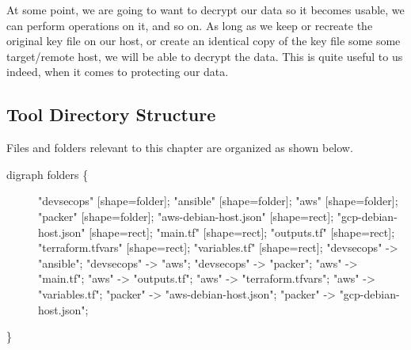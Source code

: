At some point, we are going to want to decrypt our data so it becomes
usable, we can perform operations on it, and so on. As long as we keep
or recreate the original key file on our host, or create an identical
copy of the key file some some target/remote host, we will be able to
decrypt the data. This is quite useful to us indeed, when it comes to
protecting our data.

\begin{Shaded}
   \begin{Highlighting}[]
   \end{Highlighting}
\end{Shaded}

\clearpage

\hypertarget{tool-directory-structure}{%
   \subsection{Tool Directory Structure}\label{tool-directory-structure}}

Files and folders relevant to this chapter are organized as shown below.

\begin{description}
   \item[digraph folders \{]
         "devsecops" {[}shape=folder{]}; "ansible" {[}shape=folder{]}; "aws"
         {[}shape=folder{]}; "packer" {[}shape=folder{]}; "aws-debian-host.json"
         {[}shape=rect{]}; "gcp-debian-host.json" {[}shape=rect{]}; "main.tf"
         {[}shape=rect{]}; "outputs.tf" {[}shape=rect{]}; "terraform.tfvars"
         {[}shape=rect{]}; "variables.tf" {[}shape=rect{]}; "devsecops"
         -\textgreater{} "ansible"; "devsecops" -\textgreater{} "aws";
         "devsecops" -\textgreater{} "packer"; "aws" -\textgreater{} "main.tf";
         "aws" -\textgreater{} "outputs.tf"; "aws" -\textgreater{}
         "terraform.tfvars"; "aws" -\textgreater{} "variables.tf"; "packer"
         -\textgreater{} "aws-debian-host.json"; "packer" -\textgreater{}
         "gcp-debian-host.json";
\end{description}

\}
